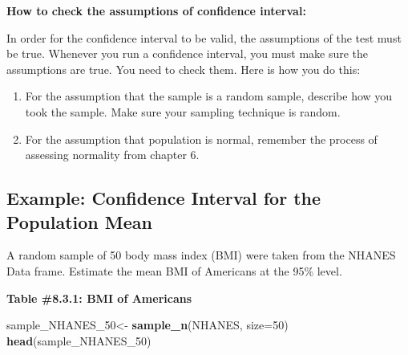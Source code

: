 \documentclass[]{book}
\newenvironment{Shaded}{\begin{snugshade}}{\end{snugshade}}
\newcommand{\DataTypeTok}[1]{\textcolor[rgb]{0.13,0.29,0.53}{#1}}
\newcommand{\DecValTok}[1]{\textcolor[rgb]{0.00,0.00,0.81}{#1}}
\newcommand{\KeywordTok}[1]{\textcolor[rgb]{0.13,0.29,0.53}{\textbf{#1}}}
\newcommand{\NormalTok}[1]{#1}
\newcommand{\StringTok}[1]{\textcolor[rgb]{0.31,0.60,0.02}{#1}}
\begin{document}
\textbf{How to check the assumptions of confidence interval:}

In order for the confidence interval to be valid, the assumptions of the test must be true. Whenever you run a confidence interval, you must make sure the assumptions are true. You need to check them. Here is how you do this:

\begin{enumerate}
\def\labelenumi{\arabic{enumi}.}
\item
  For the assumption that the sample is a random sample, describe how you took the sample. Make sure your sampling technique is random.
\item
  For the assumption that population is normal, remember the process of assessing normality from chapter 6.
\end{enumerate}

\hypertarget{example-confidence-interval-for-the-population-mean}{%
\subsection{Example: Confidence Interval for the Population Mean}\label{example-confidence-interval-for-the-population-mean}}

A random sample of 50 body mass index (BMI) were taken from the NHANES Data frame. Estimate the mean BMI of Americans at the 95\% level.

\textbf{Table \#8.3.1: BMI of Americans}

\begin{Shaded}
\begin{Highlighting}[]
\NormalTok{sample_NHANES_}\DecValTok{50}\NormalTok{<-}
\StringTok{  }\KeywordTok{sample_n}\NormalTok{(NHANES, }\DataTypeTok{size=}\DecValTok{50}\NormalTok{)}
\KeywordTok{head}\NormalTok{(sample_NHANES_}\DecValTok{50}\NormalTok{)}
\end{Highlighting}
\end{Shaded}
\end{document}

